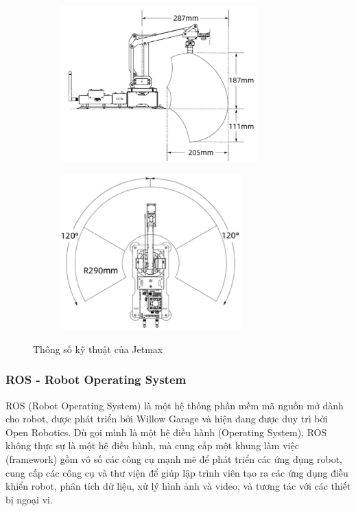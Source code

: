 \begin{figure}[!h]
\begin{subfigure}{0.5\textwidth}
\includegraphics[width=0.9\linewidth, height=6cm]{Images/Implementation/Control/Jetmax-1.jpg} 
\label{fig:subim1}
\end{subfigure}
\begin{subfigure}{0.5\textwidth}
\includegraphics[width=0.9\linewidth, height=6cm]{Images/Implementation/Control/Jetmax-2.jpg}
\label{fig:subim2}
\end{subfigure}
\caption{Thông số kỹ thuật của Jetmax}
\label{fig:image2}
\end{figure}
\subsubsection{ROS - Robot Operating System}
ROS (Robot Operating System) là một hệ thống phần mềm mã nguồn mở dành cho robot, được phát triển bởi Willow Garage và hiện đang được duy trì bởi Open Robotics. Dù gọi mình là một hệ điều hành (Operating System), ROS không thực sự là một hệ điều hành, mà cung cấp một khung làm việc (framework) gồm vô số các công cụ mạnh mẽ để phát triển các ứng dụng robot, cung cấp các công cụ và thư viện để giúp lập trình viên tạo ra các ứng dụng điều khiển robot, phân tích dữ liệu, xử lý hình ảnh và video, và tương tác với các thiết bị ngoại vi.

